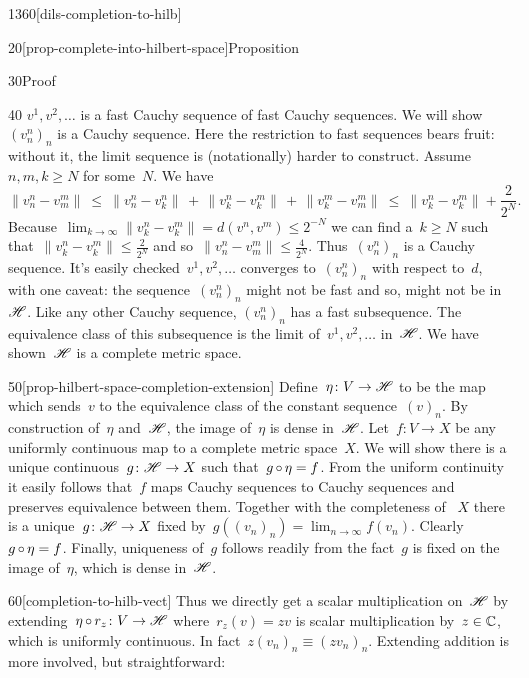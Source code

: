 \begin{parsec}{1360}[dils-completion-to-hilb]
\begin{point}{20}[prop-complete-into-hilbert-space]{Proposition}
\begin{point}{30}{Proof}
\begin{point}{40}
$v^1, v^2, \ldots$
is a fast Cauchy sequence of fast Cauchy sequences.
We will show~$(v_n^n)_n$ is a Cauchy sequence.
Here the restriction to fast sequences bears fruit:
without it, the limit sequence is (notationally) harder to construct.
Assume~$n,m,k \geq N$ for some~$N$.  We have
\begin{equation*}
    \| v^n_n - v^m_m \|
       \  \leq \ 
    \| v^n_n - v^n_k \| \,+\,
    \| v^n_k - v^m_k \| \,+\,
    \| v^m_k - v^m_m \|\  \leq \ 
    \| v^n_k - v^m_k \|+ \frac{2}{2^N}.
\end{equation*}
Because~$\lim_{k\to\infty} \|v_k^n-v_k^m \| =d(v^n,v^m) \leq 2^{-N}$
    we can find a~$k \geq N$
    such that~$\| v^n_k - v^m_k \| \leq \frac{2}{2^N}$
    and so~$\|v^n_n - v^m_m\| \leq \frac{4}{2^N}$.
    Thus~$(v^n_n)_n$ is a Cauchy sequence.
It's easily checked~$v^1, v^2, \ldots$
converges to~$(v^n_n)_n$ with respect to~$d$,
with one caveat: the sequence~$(v^n_n)_n$ might not be fast
    and so, might not be in~$\mathscr{H}$.
Like any other Cauchy sequence, $(v^n_n)_n$
    has a fast subsequence.
The equivalence class
    of this subsequence is the limit of~$v^1, v^2, \ldots$ in~$\mathscr{H}$.
We have shown~$\mathscr{H}$ is a complete metric space.
\end{point}
\begin{point}{50}[prop-hilbert-space-completion-extension]%
Define~$\eta\colon V \to \mathscr{H}$
    to be the map which sends~$v$ to the equivalence class of the
    constant sequence~$(v)_n$.
By construction of~$\eta$ and~$\mathscr{H}$,
    the image of~$\eta$ is dense in~$\mathscr{H}$.
Let~$f\colon V \to X$
    be any uniformly continuous map to a complete metric space~$X$.
We will show there is a unique continuous~$g\colon \mathscr{H} \to X$
    such that~$g \mathop{\circ} \eta = f$.
From the uniform continuity it easily follows
    that~$f$ maps Cauchy sequences to Cauchy sequences
    and preserves equivalence between them.
Together with the completeness of ~$X$
    there is a unique~$g\colon \mathscr{H} \to X$
    fixed by~$g((v_n)_n) = \lim_{n\to\infty}f(v_n)$.
Clearly~$g \mathop{\circ} \eta = f$.
Finally, uniqueness of~$g$ follows readily from
    the fact~$g$ is fixed on the image of~$\eta$,
    which is dense in~$\mathscr{H}$.
\end{point}
\begin{point}{60}[completion-to-hilb-vect]%
Thus we directly get a scalar multiplication
    on~$\mathscr{H}$ by extending~$\eta \mathop{\circ} r_z \colon V \to \mathscr{H}$
    where~$r_z(v) = zv$ is scalar multiplication by~$z \in \mathbb{C}$,
    which is uniformly continuous.
In fact~$z (v_n)_n \equiv (z v_n)_n$.
Extending addition is more involved, but straightforward:

\end{point}
\end{point}
\end{point}
\end{parsec}
